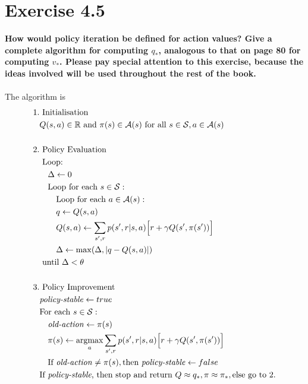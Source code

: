 \documentclass[a4paper,11pt]{article}
\numberwithin{equation}{section}
\theoremstyle{remark}
\newcommand{\R}{\mathbb R}
\DeclareMathOperator*{\argmax}{argmax}
\begin{document}
\section{Exercise 4.5}

\textbf{How would policy iteration be defined for action values? Give a complete algorithm for computing $q_*$, analogous to that on page 80 for computing $v_*$. Please pay special attention to this exercise, because the ideas involved will be used throughout the rest of the book.}
\\ \\
The algorithm is
\begin{align*}
	1. & \text{ Initialisation} \\
	   & Q(s, a) \in \R \text{ and } \pi(s) \in \mathcal{A}(s) \text{ for all } s \in \mathcal{S}, a \in \mathcal{A}(s) \\ \\	  
	2. & \text{ Policy Evaluation} \\ 
	   & \text{ Loop:} \\
	   & \quad \Delta \gets 0 \\
	   & \quad \text{Loop for each } s \in \mathcal{S}: \\
	   & \quad \quad \text{Loop for each } a \in \mathcal{A}(s): \\
	   & \quad \quad q \gets Q(s, a) \\
	   & \quad \quad Q(s, a) \gets \sum_{s', r} p(s', r | s, a) \Big[r + \gamma Q(s', \pi(s'))\Big] \\
	   & \quad \quad \Delta \gets \max(\Delta, |q - Q(s, a)|) \\
	   & \text{ until } \Delta < \theta \\ \\
	3. & \text{ Policy Improvement} \\
	   & \text{\emph{policy-stable}} \gets true \\
	   & \text{For each } s \in \mathcal{S}: \\
	   & \quad \text{\emph{old-action}} \gets \pi(s) \\
	   & \quad \pi(s) \gets \argmax_a \sum_{s', r} p(s', r | s, a) \Big[r + \gamma Q(s', \pi(s'))\Big] \\
	   & \quad \text{If \emph{old-action}} \neq \pi(s), \text{then \emph{policy-stable}} \gets false \\
	   & \text{If \emph{policy-stable}, then stop and return } Q \approx q_*, \pi \approx \pi_*, \text{else go to 2}.
\end{align*}
\end{document}
